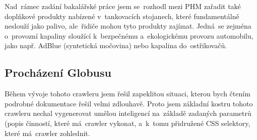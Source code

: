 Nad~rámec zadání bakalářské práce jsem se~rozhodl mezi PHM zařadit také
doplňkové produkty nabízené v~tankovacích stojanech, které fundamentálně
neslouží jako palivo, ale~řidiče mohou tyto produkty zajímat. Jedná~se
zejména o~provozní kapaliny sloužící k~bezpečnému a~ekologickému provozu
automobilu, jako např. AdBlue (syntetická močovina) nebo kapalina
do~ostřikovačů.

\subsection{Procházení Globusu}
\label{sec:crawling-globus}

Během vývoje tohoto crawleru jsem řešil zapeklitou situaci, kterou bych
čtením podrobné dokumentace řešil velmi zdlouhavě. Proto jsem základní
kostru tohoto crawleru nechal vygenerovat umělou inteligencí na~základě
zadaných parametrů (popis činností, které má~crawler vykonat, a~k~tomu
přidružené CSS selektory, které má~crawler zohlednit.
\cite{shCgjU2g2YA0ff8T} %

